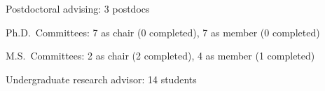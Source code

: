 \begin{veryTightItemize}
    \item Postdoctoral advising: 3 postdocs
    \item Ph.D.\ Committees: 7 as chair (0 completed), 7 as member (0 completed)
    \item M.S.\ Committees:  2 as chair (2 completed), 4 as member (1 completed)
    \item Undergraduate research advisor: 14 students
\end{veryTightItemize}
